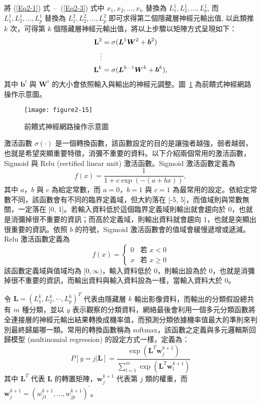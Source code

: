 \documentclass[12pt, a4paper]{article} 				%
\begin{document}
將 (\ref{Eq2-1}) 式~–~(\ref{Eq2-3}) 式中 $x_1,x_2,\ldots,x_n$ 替換為 $L_1^1, L_2^1, \ldots, L_p^1$, 而 $L_1^1, L_2^1, \ldots, L_p^1$ 替換為 $L_1^2, L_2^2, \ldots, L_p^2$ 即可求得第二個隱藏層神經元輸出值, 以此類推 $k$ 次，可得第 $k$ 個隱藏層神經元輸出值，將以上步驟以矩陣方式呈現如下：
\begin{align*}
{\bf L}^2 &=\sigma(\boldsymbol{L}^1\boldsymbol{W}^2+\boldsymbol{b}^2)\\
\vdots\notag\\
{\bf L}^k &=\sigma(\boldsymbol{L}^{k-1}\boldsymbol{W}^k+\boldsymbol{b}^k),
\end{align*}
其中 $\boldsymbol{b}^{t}$ 與 $\boldsymbol{W}^t$ 的大小會依照輸入與輸出的神經元調整。圖~\ref{Figure2-15} 為前饋式神經網路操作示意圖。

\begin{figure}[!ht]
\begin{center}
\texttt{[image: figure2-15]}
\caption{前饋式神經網路操作示意圖}\label{Figure2-15}
\end{center}
\end{figure}

激活函數 $\sigma(\cdot)$ 是一個轉換函數，該函數設定的目的是讓強者越強，弱者越弱，也就是希望突顯重要特徵，消彌不重要的資料。以下介紹兩個常用的激活函數， Sigmoid 與 Relu (rectified linear unit) 激活函數。Sigmoid 激活函數定義為
\[
f(x)=\frac{1}{1+c\exp(-(a+bx))},
\]
其中 $a$，$b$ 與 $c$ 為給定常數，而 $a=0$，$b=1$ 與 $c=1$ 為最常用的設定。依給定常數不同，該函數會有不同的臨界定義域，但大約落在 [-5, 5]，而值域則與常數無關，一定落在 [0, 1]。若輸入資料低於這個臨界定義域則輸出就會趨向於 0，也就是消彌掉很不重要的資訊；而高於定義域，則輸出資料就會趨向 1，也就是突顯出很重要的資訊。依照 $b$ 的符號，Sigmoid 激活函數會的值域會緩慢遞增或遞減。Relu 激活函數定義為
\[
f(x)=\left\{\begin{array}{cc}
0 & \mbox{若 $x<0$}\\
x & \mbox{若 $x\ge 0$}
\end{array}
\right . 
\]
該函數定義域與值域均為 $[0,\infty)$，輸入資料低於 0，則輸出設為於 0，也就是消彌掉很不重要的資訊，而輸出資料與輸入資料設為一樣，當輸入資料大於 0。
 
令 $\boldsymbol{L}=(L_1^k,L_2^k,\cdots,L_p^k)^{T}$ 代表由隱藏層 $k$ 輸出影像資料，而輸出的分類假設總共有 $m$ 種分類，並以 $y$ 表示觀察的分類資料，網絡最後會利用一個多元分類函數將全連接層的神經元輸出結果轉換成機率值，而預測分類依據機率值最大的準則來判別最終歸屬哪一類。常用的轉換函數稱為 softmax，該函數之定義與多元邏輯斯回歸模型  (multinomial regression) 的設定方式一樣，定義為：
\[
P[y=j|\boldsymbol{L}]=\frac{\exp(\boldsymbol{L}^{T}\boldsymbol{w}_j^{k+1})}{\sum_{l=1}^m\exp(\boldsymbol{L}^{T}\boldsymbol{w}_l^{k+1})}
\]
其中 $\boldsymbol{L}^T$ 代表 $\boldsymbol{L}$ 的轉置矩陣，$\boldsymbol{w}_{j}^{k+1}$ 代表第 $j$ 類的權重，而 $\boldsymbol{w}_{j}^{k+1}=(w_{j1}^{k+1},\ldots,w_{jp}^{k+1})^{'}$。
\end{document}
